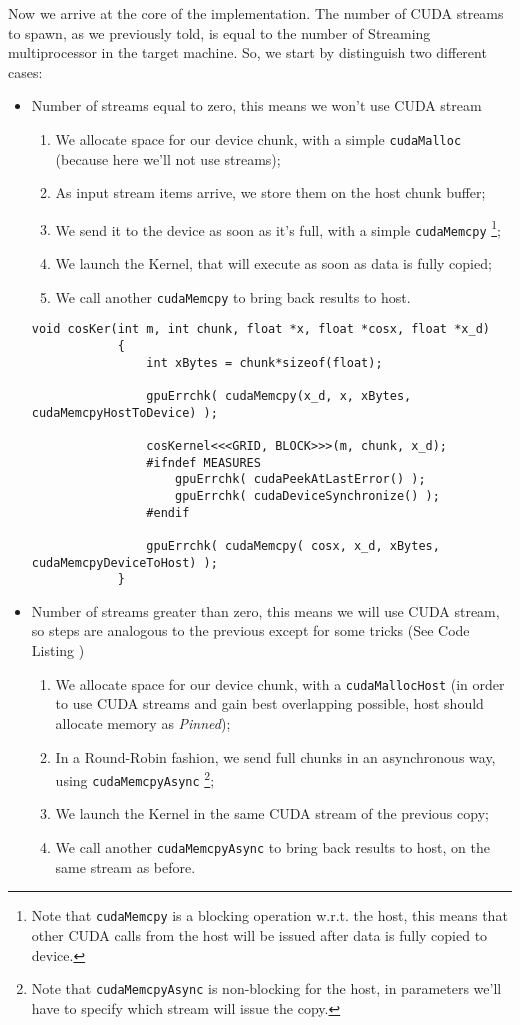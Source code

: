 	Now we arrive at the core of the implementation. The number of CUDA streams to spawn, as we previously told, is equal to the number of Streaming multiprocessor in the target machine. So, we start by distinguish two different cases:
	\begin{itemize}
		\item Number of streams equal to zero, this means we won't use CUDA stream
		\begin{enumerate}
			\item We allocate space for our device chunk, with a simple \texttt{cudaMalloc} (because here we'll not use streams);
			\item As input stream items arrive, we store them on the host chunk buffer;
			\item We send it to the device as soon as it's full, with a simple \texttt{cudaMemcpy} \footnote{Note that \texttt{cudaMemcpy} is a blocking operation w.r.t. the host, this means that other CUDA calls from the host will be issued after data is fully copied to device.};
			\item We launch the Kernel, that will execute as soon as data is fully copied;
			\item We call another \texttt{cudaMemcpy} to bring back results to host.
		\end{enumerate}
		
			\begin{lstlisting}[label=lst:noStr, caption={Data transfer host/device and kernel call, NO-CUDA Streams version}]
			void cosKer(int m, int chunk, float *x, float *cosx, float *x_d)
			{   
				int xBytes = chunk*sizeof(float);
				
				gpuErrchk( cudaMemcpy(x_d, x, xBytes, cudaMemcpyHostToDevice) ); 
				
				cosKernel<<<GRID, BLOCK>>>(m, chunk, x_d);
				#ifndef MEASURES
					gpuErrchk( cudaPeekAtLastError() );
					gpuErrchk( cudaDeviceSynchronize() );
				#endif   
				
				gpuErrchk( cudaMemcpy( cosx, x_d, xBytes, cudaMemcpyDeviceToHost) );
			}
			\end{lstlisting}
		
		\item Number of streams greater than zero, this means we will use CUDA stream, so steps are analogous to the previous except for some tricks (See Code Listing )
		\begin{enumerate}
			\item We allocate space for our device chunk, with a \texttt{cudaMallocHost} (in order to use CUDA streams and gain best overlapping possible, host should allocate memory as \textit{Pinned});
			\item In a Round-Robin fashion, we send full chunks in an asynchronous way, using \texttt{cudaMemcpyAsync} \footnote{Note that \texttt{cudaMemcpyAsync} is non-blocking for the host, in parameters we'll have to specify which stream will issue the copy.};
			\item We launch the Kernel in the same CUDA stream of the previous copy;
			\item We call another \texttt{cudaMemcpyAsync} to bring back results to host, on the same stream as before.
		\end{enumerate}
		

\end{itemize}
